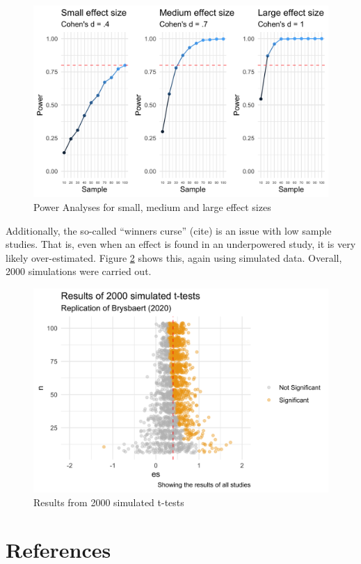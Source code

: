 \documentclass[
  man]{apa6}
\newlength{\cslhangindent}
\newlength{\cslentryspacingunit} %
\newenvironment{CSLReferences}[2] %
 {%
  \setlength{\parindent}{0pt}
  \ifodd #1
  \let\oldpar\par
  \def\par{\hangindent=\cslhangindent\oldpar}
  \fi
  \setlength{\parskip}{#2\cslentryspacingunit}
 }%
 {}
\begin{document}
\begin{figure}
\includegraphics[width=6in]{figs/power_curve} \caption{Power Analyses for small, medium and large effect sizes}\label{fig:pa}
\end{figure}

Additionally, the so-called ``winners curse'' (cite) is an issue with low sample studies.
That is, even when an effect is found in an underpowered study, it is very likely over-estimated.
Figure \ref{fig:sim} shows this, again using simulated data.
Overall, 2000 simulations were carried out.

\begin{figure}
\includegraphics[width=22.55in]{figs/2k_sim_all} \caption{Results from 2000 simulated t-tests}\label{fig:sim}
\end{figure}

\newpage

\hypertarget{references}{%
\section{References}\label{references}}

\begingroup
\setlength{\parindent}{-0.5in}
\setlength{\leftskip}{0.5in}

\hypertarget{refs}{}
\begin{CSLReferences}{0}{0}
\end{CSLReferences}

\endgroup
\end{document}
